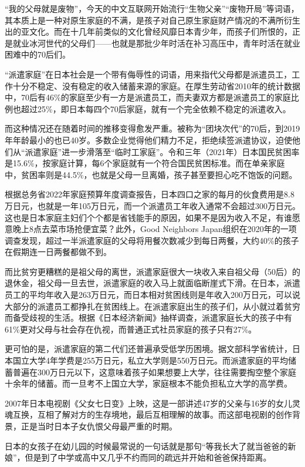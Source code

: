 “我的父母就是废物”，今天的中文互联网开始流行“生物父亲”“废物开局”等词语，其本质上是一种对原生家庭的不满，是孩子对自己原生家庭财产情况的不满所衍生出的亚文化。而在十几年前类似的文化曾经风靡日本青少年，而孩子们所恨的，正是就业冰河世代的父母们——也就是那批少年时活在补习高压中，青年时活在就业困难中的70后们。

“派遣家庭”在日本社会是一个带有侮辱性的词语，用来指代父母都是派遣员工，工作十分不稳定、没有稳定的收入储蓄来源的家庭。在厚生劳动省2010年的统计数据中，70后有46\%的家庭至少有一方是派遣员工，而夫妻双方都是派遣员工的家庭比例也超过25\%，即日本每四个70后家庭，就有一个完全依赖不稳定的派遣收入。

而这种情况还在随着时间的推移变得愈发严重。被称为“团块次代”的70后，到2019年年龄最小的也已40岁。多数企业觉得他们精力不足，拒绝续签派遣协议，迫使他们从“派遣家庭”进一步滑落至“临时工家庭”。令和三年（2021年）日本国民贫困率是15.6\%，按家庭计算，每6个家庭就有一个符合国民贫困标准。而在单亲家庭中，贫困率则是44.5\%，也就是父母一旦离婚，孩子甚至要担心吃不饱饭的问题。

根据总务省2022年家庭预算年度调查报告，日本四口之家的每月的伙食费用是8.8万日元，也就是一年105万日元，而一个派遣员工年收入通常不会超过300万日元。这也是日本家庭主妇们个个都是省钱能手的原因，如果不是因为收入不足，有谁愿意晚上8点去菜市场抢便宜菜？此外，Good Neighbors Japan组织在2020年的一项调查发现，超过一半派遣家庭的父母将用餐次数减少到每日两餐，大约40\%的孩子在假期连一日两餐都做不到。

而比贫穷更糟糕的是祖父母的离世，派遣家庭很大一块收入来自祖父母（50后）的退休金，祖父母一旦去世，派遣家庭的收入马上就面临断崖式下滑。在日本，派遣员工的平均年收入是263万日元，而日本相对贫困线则是年收入200万日元，可以说大部分的派遣员工都挣扎在贫困线上。在派遣家庭出生的孩子们，从小就过着贫穷而备受歧视的生活。根据《日本经济新闻》抽样调查，派遣家庭长大的孩子中有61\%更对父母与社会存在仇视，而普通正式社员家庭的孩子只有27\%。

更可怕的是，派遣家庭的第二代们还普遍承受低学历困境。据文部科学省统计，日本国立大学4年学费是255万日元，私立大学则是550万日元。而派遣家庭的平均储蓄普遍在300万日元以下，这意味着孩子如果想要上大学，往往需要掏空整个家庭十余年的储蓄。而一旦考不上国立大学，家庭根本不能负担私立大学的高学费。

2007年日本电视剧《父女七日变》上映，这是一部讲述47岁的父亲与16岁的女儿灵魂互换，互相了解对方的生存境地，最后互相理解的故事。而这部电视剧的创作背景，正是当时日本子女仇恨父母最严重的时期。

日本的女孩子在幼儿园的时候最常说的一句话就是那句“等我长大了就当爸爸的新娘”，但是到了中学或高中又几乎不约而同的疏远并开始和爸爸保持距离。

